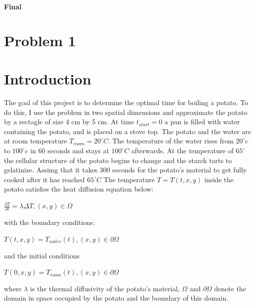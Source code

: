 \documentclass[12pt]{article}
\begin{document}
\centerline{\Large\textbf{Final}}
\vspace{2cm}
\section{Problem 1}\label{sec::Problem 1}
\section*{Introduction}\label{sec::Intro}
The goal of this project is to determine the optimal time for boiling a potato.  To do this, I use the problem in two spatial dimensions and approximate the potato by a rectagle of size 4 cm by 5 cm.  At time $t_{start}=0$ a pan is filled with water containing the potato, and is placed on a stove top.  The potato and the water are at room temperature $T_{room} = 20^\circ C$.  The temperature of the water rises from $20^\circ c$ to $100^\circ c$ in 60 seconds and stays at $100^\circ C$ afterwards.  At the temperature of $65^\circ$ the cellular structure of the potato begins to change and the starch tarts to gelatinize.  Assimg that it takes 300 seconds for the potato's material to get fully cooked after it has reached $65^\circ C$  The temperature $T = T(t,x,y)$ inside the potato satisfies the heat diffusion equation below:
\begin{center}
$
\frac{\partial T}{\partial t}= \lambda \Delta T , (x,y) \in \Omega
$
\end{center}
with the boundary conditions:
\begin{center}
$
T(t,x,y) = T_{water}(t), (x,y) \in \partial \Omega
$
\end{center}
and the initial conditions
\begin{center}
$
T(0,x,y) = T_{room}(t), (x,y) \in \partial \Omega
$
\end{center}
where $\lambda$ is the thermal diffusivity of the potato's material, $\Omega$ and $\partial \Omega$ denote the domain in space occupied by the potato and the boundary of this domain.
\end{document}
